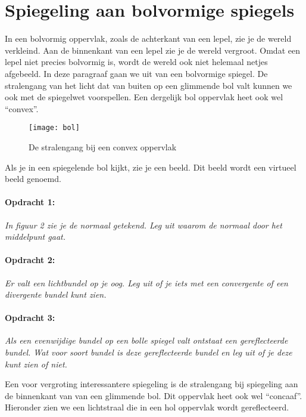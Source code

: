 \section{Spiegeling aan bolvormige spiegels}

In een bolvormig oppervlak, zoals de achterkant van een lepel, zie
je de wereld verkleind. Aan de binnenkant van een lepel zie je de
wereld vergroot. Omdat een lepel niet precies bolvormig is, wordt
de wereld ook niet helemaal netjes afgebeeld. In deze paragraaf gaan
we uit van een bolvormige spiegel. De stralengang van het licht dat
van buiten op een glimmende bol valt kunnen we ook met de spiegelwet
voorspellen. Een dergelijk bol oppervlak heet ook wel ``convex''.

\begin{figure}[H]
\noindent \begin{centering}
\texttt{[image: bol]}
\par\end{centering}

\caption{De stralengang bij een convex oppervlak}
\end{figure}


Als je in een spiegelende bol kijkt, zie je een beeld. Dit beeld wordt
een virtueel beeld genoemd.

\paragraph*{Opdracht 1:}

\emph{In figuur 2 zie je de normaal getekend. Leg uit waarom de normaal
door het middelpunt gaat.}

\paragraph*{Opdracht 2:}

\emph{Er valt een lichtbundel op je oog. Leg uit of je iets met een
convergente of een divergente bundel kunt zien.}

\paragraph*{Opdracht 3:}

\emph{Als een evenwijdige bundel op een bolle spiegel valt ontstaat
een gereflecteerde bundel. Wat voor soort bundel is deze gereflecteerde
bundel en leg uit of je deze kunt zien of niet.}

Een voor vergroting interessantere spiegeling is de stralengang bij
spiegeling aan de binnenkant van van een glimmende bol. Dit oppervlak
heet ook wel ``concaaf''. Hieronder zien we een lichtstraal die
in een hol oppervlak wordt gereflecteerd.

